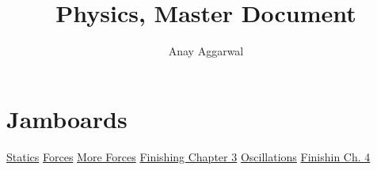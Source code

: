 \documentclass[11pt]{scrartcl}
\title{Physics, Master Document}
\author{Anay Aggarwal}
\begin{document}
\maketitle
\section{Jamboards}
\href{https://jamboard.google.com/d/1uoYdMKXinEdf1\_fIV\_Um4zPiH8XeXSZzDs1etD-xgbI/viewer?f=0}{Statics} \newline
\href{https://jamboard.google.com/d/1ajkcgySLsFFmAIlD7kHRhOTfPmT233VM9uvkb6ygHFg/viewer?f=0}{Forces} \newline
\href{https://jamboard.google.com/d/19tQ1\_l9Pz5J62Dyj3KkGLjumSymWhyoXW8kS4kQQBSg/viewer?f=0}{More Forces} \newline
\href{https://jamboard.google.com/d/1MbDdIBIItbUHffvw165ii3ZKFlsYYW7sVqZbw3JTE5k/viewer?f=0}{Finishing Chapter 3} \newline
\href{https://jamboard.google.com/d/1dbo9FVwQZNCMXaT9OfHmJFNlvY1AcgZkJbSVOeSiLaU/viewer?f=0}{Oscillations} \newline
\href{https://jamboard.google.com/d/1a9brHy7W-hm7C\_LCcwz4QAHZM4OQ06tv0LuvaHiV9q0/viewer?f=0}{Finishin Ch. 4}
\newpage
\end{document}
